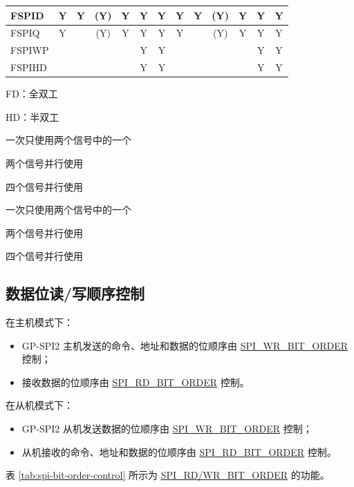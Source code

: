 \documentclass[main\_\_CN.tex]{subfiles}
\begin{document}
\begin{landscape}
\begin{table}[H]
\begin{threeparttable}
\begin{tabular}{ |p{2.0cm} |c|c|c|c|c|c|c|c|c|c|c|c| }
FSPID                    & Y       & Y       & (Y)\tnote{3}      & Y\tnote{4}      & Y\tnote{5}      & Y      & Y       & Y      & (Y)\tnote{6}      & Y\tnote{7}     & Y\tnote{8}     & Y      \\ \hline
FSPIQ                    & Y       &         & (Y)\tnote{3}      & Y\tnote{4}      & Y\tnote{5}      & Y      & Y       &        & (Y)\tnote{6}     & Y\tnote{7}     & Y\tnote{8}      & Y      \\ \hline
FSPIWP                   &         &         &         &         & Y\tnote{5}      & Y      &         &        &         &         & Y\tnote{8}       & Y      \\ \hline
FSPIHD                   &         &         &         &         & Y\tnote{5}      & Y      &         &        &         &         & Y\tnote{8}       & Y      \\ \hline
\end{tabular}

        \begin{tablenotes}
            \item[1] FD：全双工
            \item[2] HD：半双工
            \item[3] 一次只使用两个信号中的一个
            \item[4] 两个信号并行使用
            \item[5] 四个信号并行使用
            \item[6] 一次只使用两个信号中的一个
            \item[7] 两个信号并行使用
            \item[8] 四个信号并行使用
        \end{tablenotes}
     \end{threeparttable}
    \end{table}
\end{landscape}

\subsection{数据位读/写顺序控制}
在主机模式下：
\begin{itemize}
    \item GP-SPI2 主机发送的命令、地址和数据的位顺序由 \hyperref[fielddesc:SPIWRBITORDER]{SPI\_WR\_BIT\_ORDER} 控制；
    \item 接收数据的位顺序由 \hyperref[fielddesc:SPIRDBITORDER]{SPI\_RD\_BIT\_ORDER} 控制。
\end{itemize}
在从机模式下：
\begin{itemize}
    \item GP-SPI2 从机发送数据的位顺序由 \hyperref[fielddesc:SPIWRBITORDER]{SPI\_WR\_BIT\_ORDER} 控制；
    \item 从机接收的命令、地址和数据的位顺序由 \hyperref[fielddesc:SPIRDBITORDER]{SPI\_RD\_BIT\_ORDER} 控制。
\end{itemize}
表 \ref{tab:spi-bit-order-control} 所示为 \hyperref[fielddesc:SPIRDBITORDER]{SPI\_RD/WR\_BIT\_ORDER} 的功能。
\end{document}

